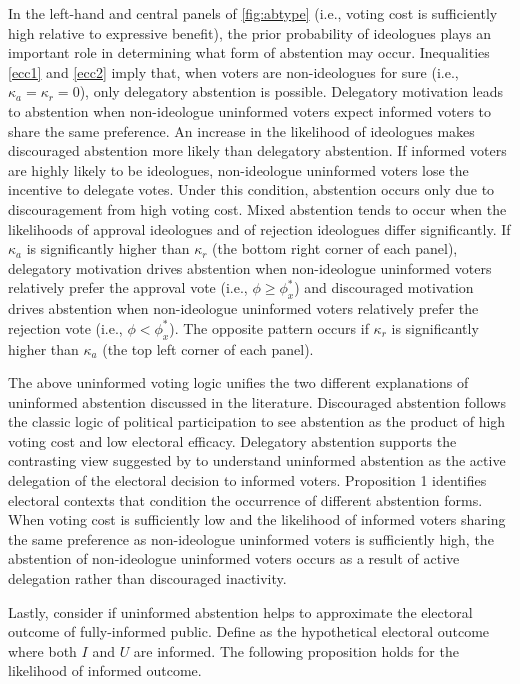 \documentclass[letterpaper, 12pt]{article}
\begin{document}
    \par In the left-hand and central panels of \autoref{fig:abtype} (i.e., voting cost is sufficiently high relative to expressive benefit), the prior probability of ideologues plays an important role in determining what form of abstention may occur. Inequalities \ref{ecc1} and \ref{ecc2} imply that, when voters are non-ideologues for sure (i.e., $\kappa_{a} = \kappa_{r} = 0$), only delegatory abstention is possible. Delegatory motivation leads to abstention when non-ideologue uninformed voters expect informed voters to share the same preference. An increase in the likelihood of ideologues makes discouraged abstention more likely than delegatory abstention. If informed voters are highly likely to be ideologues, non-ideologue uninformed voters lose the incentive to delegate votes. Under this condition, abstention occurs only due to discouragement from high voting cost. Mixed abstention tends to occur when the likelihoods of approval ideologues and of rejection ideologues differ significantly. If $\kappa_a$ is significantly higher than $\kappa_r$ (the bottom right corner of each panel), delegatory motivation drives abstention when non-ideologue uninformed voters relatively prefer the approval vote (i.e., $\phi \geq \phi^*_x$) and discouraged motivation drives abstention when non-ideologue uninformed voters relatively prefer the rejection vote (i.e., $\phi < \phi^*_x$). The opposite pattern occurs if $\kappa_r$ is significantly higher than $\kappa_a$ (the top left corner of each panel).
    
    \par The above uninformed voting logic unifies the two different explanations of uninformed abstention discussed in the literature. Discouraged abstention follows the classic logic of political participation \citep{Downs1957anec} to see abstention as the product of high voting cost and low electoral efficacy. Delegatory abstention supports the contrasting view suggested by \cite{Feddersen1996thsw} to understand uninformed abstention as the active delegation of the electoral decision to informed voters. Proposition 1 identifies electoral contexts that condition the occurrence of different abstention forms. When voting cost is sufficiently low and the likelihood of informed voters sharing the same preference as non-ideologue uninformed voters is sufficiently high, the abstention of non-ideologue uninformed voters occurs as a result of active delegation rather than discouraged inactivity.
    
    \par Lastly, consider if uninformed abstention helps to approximate the electoral outcome of fully-informed public. Define  as the hypothetical electoral outcome where both $I$ and $U$ are informed. The following proposition holds for the likelihood of informed outcome.   
    
\end{document}
